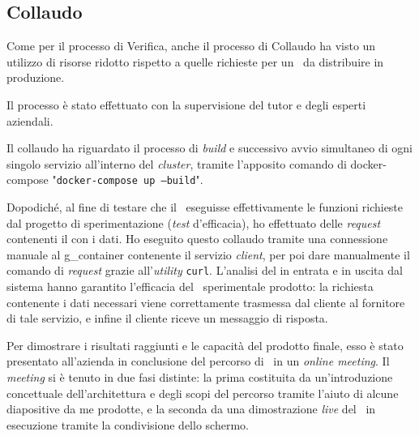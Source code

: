 \subsection{Collaudo}

Come per il processo di Verifica, anche il processo di Collaudo ha visto un utilizzo di risorse ridotto rispetto a quelle richieste per un \software\ da distribuire in produzione.

Il processo è stato effettuato con la supervisione del tutor e degli esperti aziendali.

Il collaudo ha riguardato il processo di \textit{build} e successivo avvio simultaneo di ogni singolo servizio all'interno del \textit{cluster}, tramite l'apposito comando di docker-compose "\texttt{docker-compose up --build}".

Dopodiché, al fine di testare che il \software\ eseguisse effettivamente le funzioni richieste dal progetto di sperimentazione (\textit{test} d'efficacia), ho effettuato delle   \textit{request} contenenti il  con i dati.
Ho eseguito questo collaudo tramite una connessione manuale al \gls{g_container} contenente il servizio  \textit{client}, per poi dare manualmente il comando di \textit{request} grazie all'\textit{utility} \texttt{curl}.
L'analisi del  in entrata e in uscita dal sistema hanno garantito l'efficacia del \software\ sperimentale prodotto: la richiesta contenente i dati necessari viene correttamente trasmessa dal cliente al fornitore di tale servizio, e infine il cliente riceve un messaggio di risposta.

Per dimostrare i risultati raggiunti e le capacità del prodotto finale, esso è stato presentato all'azienda in conclusione del percorso di \stage\ in un \textit{online meeting}.
Il \textit{meeting} si è tenuto in due fasi distinte: la prima costituita da un'introduzione concettuale dell'architettura e degli scopi del percorso tramite l'aiuto di alcune diapositive da me prodotte, e la seconda da una dimostrazione \textit{live} del \software\ in esecuzione tramite la condivisione dello schermo.

